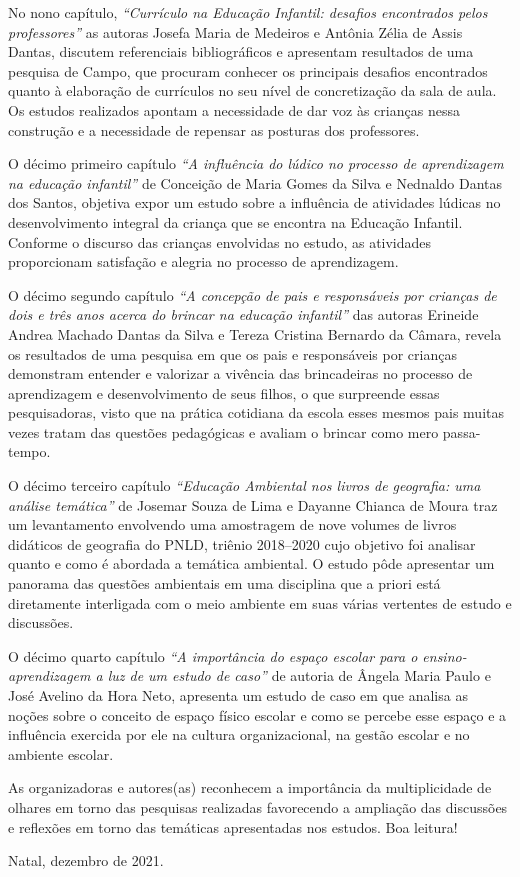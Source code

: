 No nono capítulo, \textit{“Currículo na Educação Infantil: desafios encontrados
pelos professores”} as autoras Josefa Maria de Medeiros e Antônia Zélia de
Assis Dantas, discutem referenciais bibliográficos e apresentam resultados de
uma pesquisa de Campo, que procuram conhecer os principais desafios encontrados
quanto à elaboração de currículos no seu nível de concretização da sala de
aula. Os estudos realizados apontam a necessidade de dar voz às crianças nessa
construção e a necessidade de repensar as posturas dos professores.

O décimo primeiro capítulo \textit{“A influência do lúdico no processo de
aprendizagem na educação infantil”} de Conceição de Maria Gomes da Silva e
Nednaldo Dantas dos Santos, objetiva expor um estudo sobre a influência de
atividades lúdicas no desenvolvimento integral da criança que se encontra na
Educação Infantil. Conforme o discurso das crianças envolvidas no estudo, as
atividades proporcionam satisfação e alegria no processo de aprendizagem.

O décimo segundo capítulo \textit{“A concepção de pais e responsáveis por
crianças de dois e três anos acerca do brincar na educação infantil”} das
autoras Erineide Andrea Machado Dantas da Silva e Tereza Cristina Bernardo da
Câmara, revela os resultados de uma pesquisa em que os pais e responsáveis por
crianças demonstram entender e valorizar a vivência das brincadeiras no
processo de aprendizagem e desenvolvimento de seus filhos, o que surpreende
essas pesquisadoras, visto que na prática cotidiana da escola esses mesmos pais
muitas vezes tratam das questões pedagógicas e avaliam o brincar como mero
passa-tempo.

O décimo terceiro capítulo \textit{“Educação Ambiental nos livros de geografia:
uma análise temática”} de Josemar Souza de Lima e Dayanne Chianca de Moura traz
um levantamento envolvendo uma amostragem de nove volumes de livros didáticos
de geografia do PNLD, triênio 2018--2020 cujo objetivo foi analisar quanto e
como é abordada a temática ambiental. O estudo pôde apresentar um panorama das
questões ambientais em uma disciplina que a priori está diretamente interligada
com o meio ambiente em suas várias vertentes de estudo e discussões.

O décimo quarto capítulo \textit{“A importância do espaço escolar para o
ensino-aprendizagem a luz de um estudo de caso”} de autoria de Ângela Maria
Paulo e José Avelino da Hora Neto, apresenta um estudo de caso em que analisa
as noções sobre o conceito de espaço físico escolar e como se percebe esse
espaço e a influência exercida por ele na cultura organizacional, na gestão
escolar e no ambiente escolar.

As organizadoras e autores(as) reconhecem a importância da multiplicidade de
olhares em torno das pesquisas realizadas favorecendo a ampliação das
discussões e reflexões em torno das temáticas apresentadas nos estudos. Boa
leitura!

\bigskip

\hfill Natal, dezembro de 2021.
